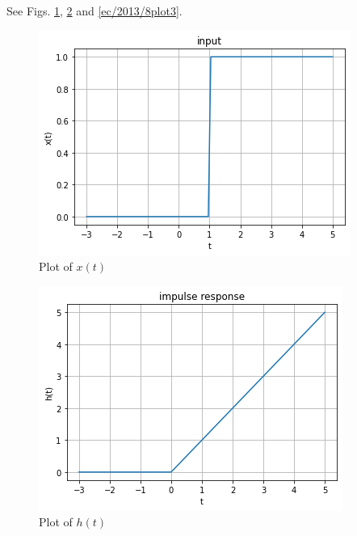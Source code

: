 See Figs. \ref{ec/2013/8plot1}, \ref{ec/2013/8plot2} and \ref{ec/2013/8plot3}.
%
\begin{figure}[!h]
 \centering
 \includegraphics[width=\columnwidth]{solutions/ec/2013/8/figures/GateAssignment1(1).png}
 \caption{Plot of $x(t)$}
 \label{ec/2013/8plot1}
\end{figure}

\begin{figure}[!h]
 \centering
 \includegraphics[width=\columnwidth]{solutions/ec/2013/8/figures/GateAssignment1(2).png}
 \caption{Plot of $h(t)$}
 \label{ec/2013/8plot2}
\end{figure}

